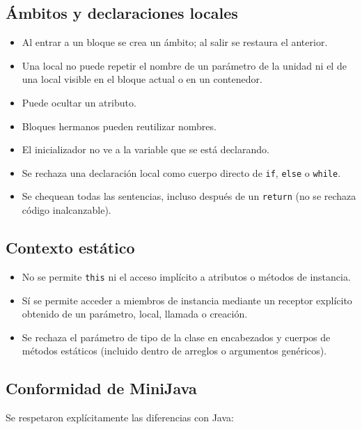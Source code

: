 \documentclass[11pt,a4paper]{article}
\begin{document}
\subsection{Ámbitos y declaraciones locales}

\begin{itemize}
  \item Al entrar a un bloque se crea un ámbito; al salir se restaura el anterior.
  \item Una local no puede repetir el nombre de un parámetro de la unidad ni el de
        una local visible en el bloque actual o en un contenedor.
  \item Puede ocultar un atributo.
  \item Bloques hermanos pueden reutilizar nombres.
  \item El inicializador no ve a la variable que se está declarando.
  \item Se rechaza una declaración local como cuerpo directo de \texttt{if},
        \texttt{else} o \texttt{while}.
  \item Se chequean todas las sentencias, incluso después de un \texttt{return}
        (no se rechaza código inalcanzable).
\end{itemize}

\subsection{Contexto estático}

\begin{itemize}
  \item No se permite \texttt{this} ni el acceso implícito a atributos o métodos
        de instancia.
  \item Sí se permite acceder a miembros de instancia mediante un receptor
        explícito obtenido de un parámetro, local, llamada o creación.
  \item Se rechaza el parámetro de tipo de la clase en encabezados y cuerpos de
        métodos estáticos (incluido dentro de arreglos o argumentos genéricos).
\end{itemize}

\subsection{Conformidad de MiniJava}

Se respetaron explícitamente las diferencias con Java:
\end{document}
